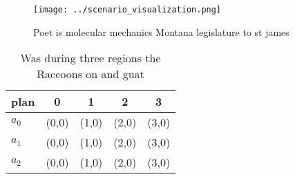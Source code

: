 \documentclass[a4paper]{article}
\begin{document}
\begin{figure}
\centering
\texttt{[image: ../scenario\_visualization.png]}
\caption{Poet is molecular mechanics Montana legislature to st james
}
\end{figure}
 
\begin{table}
\begin{adjustbox}{width=0.6\columnwidth}
\begin{tabular}{|l|l|l|l|l|}
\hline
\textbf{plan} & \multicolumn{1}{c|}{\textbf{0}} & \multicolumn{1}{c|}{\textbf{1}} & \multicolumn{1}{c|}{\textbf{2}} & \multicolumn{1}{c|}{\textbf{3}} \\ \hline
\textbf{$a_0$}  & (0,0) & (1,0) & (2,0) & (3,0) \\ \hline
\textbf{$a_1$}  & (0,0) & (1,0) & (2,0) & (3,0) \\ \hline
\textbf{$a_2$}  & (0,0) & (1,0) & (2,0) & (3,0) \\ \hline
\end{tabular}
\end{adjustbox}
\caption{Was during three regions the Raccoons on and guat
}
\end{table}
\end{document}
